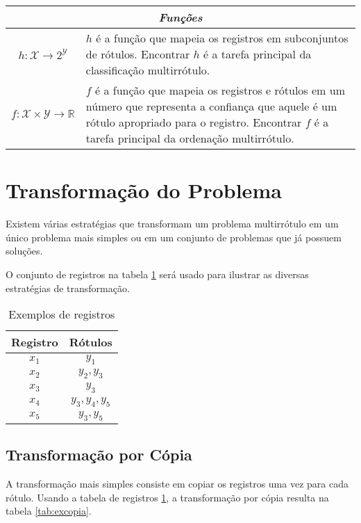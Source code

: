 \documentclass[runningheads,a4paper]{llncs}
\begin{document}
\begin{center}
\begin{tabular}{| c | m{9cm} |}
	\hline
	\multicolumn{2}{|c|}{\textit{Funções}} \\
	\hline
	$h : \mathcal{X} \to 2^\mathcal{Y}$ & $h$ é a função que mapeia os registros em subconjuntos de rótulos. Encontrar $h$ é a tarefa principal da classificação multirrótulo. \\
	\hline
	$f : \mathcal{X} \times \mathcal{Y} \to \mathbb{R}$ & $f$ é a função que mapeia os registros e rótulos em um número que representa a confiança que aquele é um rótulo apropriado para o registro. Encontrar $f$ é a tarefa principal da ordenação multirrótulo. \\
	\hline
\end{tabular}
\end{center}	

\section{Transformação do Problema}\label{sec:transprob}

Existem várias estratégias que transformam um problema multirrótulo em um único problema mais simples ou em um conjunto de problemas que já possuem soluções.

O conjunto de registros na tabela \ref{tab:exbase} será usado para ilustrar as diversas estratégias de transformação.

\begin{table}
\centering
\begin{tabular}{| c | c |}
	\hline
	\textbf{Registro} & \textbf{Rótulos} \\
	\hline
	$x_1$ & $y_1$ \\
	\hline
	$x_2$ & $y_2, y_3$ \\
	\hline
	$x_3$ & $y_3$ \\
	\hline
	$x_4$ & $y_3, y_4, y_5$ \\
	\hline
	$x_5$ & $y_3, y_5$ \\
	\hline
\end{tabular}
\caption{Exemplos de registros}
\label{tab:exbase}
\end{table}

\subsection{Transformação por Cópia}

A transformação mais simples consiste em copiar os registros uma vez para cada rótulo. Usando a tabela de registros \ref{tab:exbase}, a transformação por cópia resulta na tabela \ref{tab:excopia}.
\end{document}

